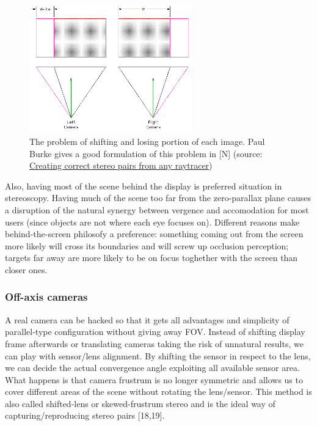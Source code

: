 \begin{figure}
\centering
\includegraphics[width=7cm]{schemas/parallel}
\caption{The problem of shifting and losing portion of each image. Paul Burke gives a good formulation of this problem in [N] (source: \href{http://klee.cittastudi.di.unimi.it/~dan/PGL/doc/articoli&libri/CalculatingStereoPairs.pdf} {Creating correct stereo pairs from any raytracer})}
\label{fig:parallel_cameras}
\end{figure}

Also, having most of the scene behind the display is preferred situation in stereoscopy. Having much of the scene too far from the zero-parallax plane causes a disruption of the natural synergy between vergence and accomodation for most users (since objects are not where each eye focuses on). Different reasons make behind-the-screen philosofy a preference: something coming out from the screen more likely will cross its boundaries and will screw up occlusion perception; targets far away are more likely to be on focus toghether with the screen than closer ones.

\subsubsection{Off-axis cameras}
A real camera can be hacked so that it gets all advantages and simplicity of parallel-type configuration without giving away FOV. Instead of shifting display frame afterwards or translating cameras taking the risk of unnatural results, we can play with sensor/lens alignment. By shifting the sensor in respect to the lens, we can decide the actual convergence angle exploiting all available sensor area. What happens is that camera frustrum is no longer symmetric and allows us to cover different areas of the scene without rotating the lens/sensor. This method is also called shifted-lens or skewed-frustrum stereo and is the ideal way of capturing/reproducing stereo pairs [18,19].

